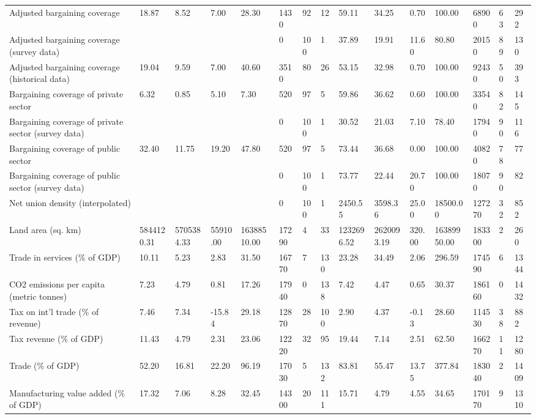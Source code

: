 \begin{longtable}{lllllllllllllll}
Adjusted bargaining coverage & 18.87 & 8.52 & 7.00 & 28.30 & 1430 & 92 & 12 & 59.11 & 34.25 & 0.70 & 100.00 & 68900 & 63 & 292\\
Adjusted bargaining coverage (survey data) &  &  &  &  & 0 & 100 & 1 & 37.89 & 19.91 & 11.60 & 80.80 & 20150 & 89 & 130\\
Adjusted bargaining coverage (historical data) & 19.04 & 9.59 & 7.00 & 40.60 & 3510 & 80 & 26 & 53.15 & 32.98 & 0.70 & 100.00 & 92430 & 50 & 393\\
Bargaining coverage of private sector & 6.32 & 0.85 & 5.10 & 7.30 & 520 & 97 & 5 & 59.86 & 36.62 & 0.60 & 100.00 & 33540 & 82 & 145\\
\addlinespace
Bargaining coverage of private sector (survey data) &  &  &  &  & 0 & 100 & 1 & 30.52 & 21.03 & 7.10 & 78.40 & 17940 & 90 & 116\\
Bargaining coverage of public sector & 32.40 & 11.75 & 19.20 & 47.80 & 520 & 97 & 5 & 73.44 & 36.68 & 0.00 & 100.00 & 40820 & 78 & 77\\
Bargaining coverage of public sector (survey data) &  &  &  &  & 0 & 100 & 1 & 73.77 & 22.44 & 20.70 & 100.00 & 18070 & 90 & 82\\
Net union density (interpolated) &  &  &  &  & 0 & 100 & 1 & 2450.55 & 3598.36 & 25.00 & 18500.00 & 127270 & 32 & 852\\
Land area (sq. km) & 5844120.31 & 5705384.33 & 55910.00 & 16388510.00 & 17290 & 4 & 33 & 1232696.52 & 2620093.19 & 320.00 & 16389950.00 & 183300 & 2 & 260\\
\addlinespace
Trade in services (\% of GDP) & 10.11 & 5.23 & 2.83 & 31.50 & 16770 & 7 & 130 & 23.28 & 34.49 & 2.06 & 296.59 & 174590 & 6 & 1344\\
CO2 emissions per capita (metric tonnes) & 7.23 & 4.79 & 0.81 & 17.26 & 17940 & 0 & 138 & 7.42 & 4.47 & 0.65 & 30.37 & 186160 & 0 & 1432\\
Tax on int'l trade (\% of revenue) & 7.46 & 7.34 & -15.84 & 29.18 & 12870 & 28 & 100 & 2.90 & 4.37 & -0.13 & 28.60 & 114530 & 38 & 882\\
Tax revenue (\% of GDP) & 11.43 & 4.79 & 2.31 & 23.06 & 12220 & 32 & 95 & 19.44 & 7.14 & 2.51 & 62.50 & 166270 & 11 & 1280\\
Trade (\% of GDP) & 52.20 & 16.81 & 22.20 & 96.19 & 17030 & 5 & 132 & 83.81 & 55.47 & 13.75 & 377.84 & 183040 & 2 & 1409\\
\addlinespace
Manufacturing value added (\% of GDP) & 17.32 & 7.06 & 8.28 & 32.45 & 14300 & 20 & 111 & 15.71 & 4.79 & 4.55 & 34.65 & 170170 & 9 & 1310\\

\end{longtable}
